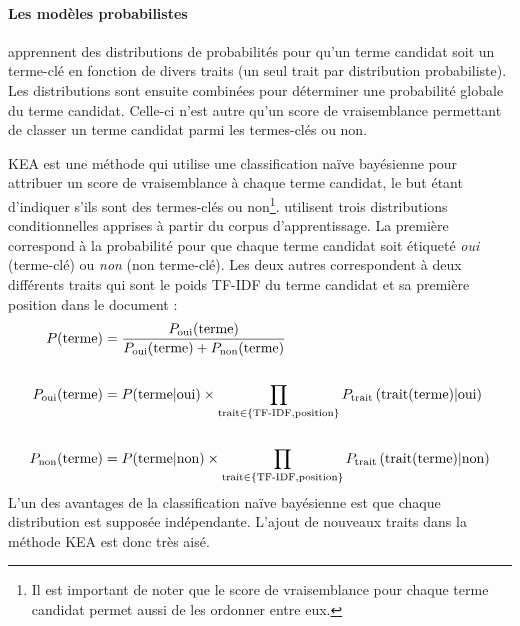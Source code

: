       \paragraph{Les modèles probabilistes}
        apprennent des distributions de probabilités pour qu'un terme candidat
        soit un terme-clé en fonction de divers traits (un seul trait par
        distribution probabiliste). Les distributions sont ensuite combinées pour
        déterminer une probabilité globale du terme candidat. Celle-ci n'est autre
        qu'un score de vraisemblance permettant de classer un terme candidat parmi
        les termes-clés ou non.

        KEA \citep{witten1999kea} est une méthode qui utilise une classification
        naïve bayésienne pour attribuer un score de vraisemblance à chaque terme
        candidat, le but étant d'indiquer s'ils sont des termes-clés ou
        non\footnote{Il est important de noter que le score de vraisemblance pour
        chaque terme candidat permet aussi de les ordonner entre eux.}.
        \citet{witten1999kea} utilisent trois distributions conditionnelles
        apprises à partir du corpus d'apprentissage. La première correspond à la
        probabilité pour que chaque terme candidat soit étiqueté \textit{oui}
        (terme-clé) ou \textit{non} (non terme-clé). Les deux autres correspondent
        à deux différents traits qui sont le poids TF-IDF du terme candidat et sa
        première position dans le document :
        \begin{align}
          P(\text{terme}) &= \frac{P_{\text{oui}}(\text{terme})}{P_{\text{oui}}(\text{terme}) + P_{\text{non}}(\text{terme})} \label{math:kea}\\
          \notag\\
          P_{\text{oui}}(\text{terme}) &= P(\text{terme} | \text{oui}) \times \prod_{\text{trait} \in \{\text{TF-IDF}, \text{position}\}} P_{\text{trait}}\left(\text{trait}(\text{terme}) | \text{oui}\right) \notag\\
          \notag\\
          P_{\text{non}}(\text{terme}) &= P(\text{terme} | \text{non}) \times \prod_{\text{trait} \in \{\text{TF-IDF}, \text{position}\}} P_{\text{trait}}\left(\text{trait}(\text{terme}) | \text{non}\right) \notag
        \end{align}
        L'un des avantages de la classification naïve bayésienne est que chaque
        distribution est supposée indépendante. L'ajout de nouveaux traits dans la
        méthode KEA est donc très aisé.
        
